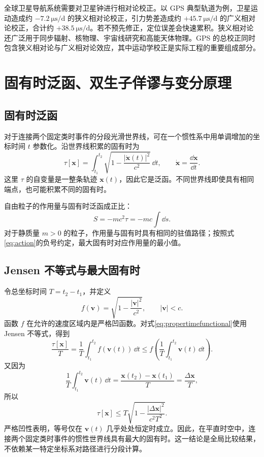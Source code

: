 \documentclass[style=classic,color=full]{lc-article}
\begin{document}
全球卫星导航系统需要对卫星钟进行相对论校正。以 GPS 典型轨道为例，卫星运动造成约 $-\SI{7.2}{\micro\second\per\day}$ 的狭义相对论校正，引力势差造成约 $+\SI{45.7}{\micro\second\per\day}$ 的广义相对论校正，合计约 $+\SI{38.5}{\micro\second\per\day}$\cite{ashby2003}。若不预先修正，定位误差会快速累积。狭义相对论还广泛用于同步辐射、核物理、宇宙线研究和高能天体物理。GPS 的总校正同时包含狭义相对论与广义相对论效应，其中运动学校正是实际工程的重要组成部分。

\section{固有时泛函、双生子佯谬与变分原理}

\subsection{固有时泛函}

对于连接两个固定类时事件的分段光滑世界线，可在一个惯性系中用单调增加的坐标时间 $t$ 参数化。沿世界线积累的固有时为
\begin{equation}
  \tau[\bm x]
  =\int_{t_1}^{t_2}
  \sqrt{1-\frac{\lvert\dot{\bm x}(t)\rvert^2}{c^2}}\,\dd t,
  \qquad
  \dot{\bm x}=\frac{\dd\bm x}{\dd t}.
  \label{eq:propertimefunctional}
\end{equation}
这里 $\tau$ 的自变量是一整条轨迹 $\bm x(t)$，因此它是泛函。不同世界线即使具有相同端点，也可能积累不同的固有时。

自由粒子的作用量与固有时泛函成正比：
\begin{equation}
  S=-mc^2\tau=-mc\int\dd s.
  \label{eq:action}
\end{equation}
对于静质量 $m>0$ 的粒子，作用量与固有时具有相同的驻值路径；按照式\eqref{eq:action}的负号约定，最大固有时对应作用量的最小值。

\subsection{Jensen 不等式与最大固有时}

令总坐标时间 $T=t_2-t_1$，并定义
\begin{equation}
  f(\bm v)=\sqrt{1-\frac{\lvert\bm v\rvert^2}{c^2}},
  \qquad \lvert\bm v\rvert<c.
\end{equation}
函数 $f$ 在允许的速度区域内是严格凹函数。对式\eqref{eq:propertimefunctional}使用 Jensen 不等式，得到
\begin{equation}
  \frac{\tau[\bm x]}{T}
  =\frac{1}{T}\int_{t_1}^{t_2}f(\bm v(t))\,\dd t
  \leq
  f\left(
    \frac{1}{T}\int_{t_1}^{t_2}\bm v(t)\,\dd t
  \right).
\end{equation}
又因为
\begin{equation}
  \frac{1}{T}\int_{t_1}^{t_2}\bm v(t)\,\dd t
  =\frac{\bm x(t_2)-\bm x(t_1)}{T}
  =\frac{\Delta\bm x}{T},
\end{equation}
所以
\begin{equation}
  \boxed{
  \tau[\bm x]
  \leq T\sqrt{1-
    \frac{\lvert\Delta\bm x\rvert^2}{c^2T^2}}.}
  \label{eq:jensenpropertime}
\end{equation}
严格凹性表明，等号仅在 $\bm v(t)$ 几乎处处恒定时成立。因此，在平直时空中，连接两个固定类时事件的惯性世界线具有最大的固有时。这一结论是全局比较结果，不依赖某一特定坐标系对路径进行分段计算。
\end{document}
